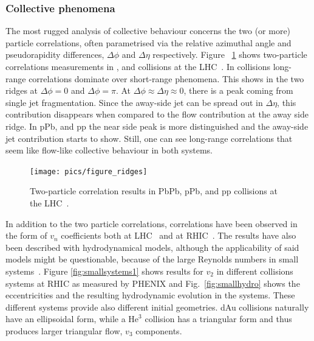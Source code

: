 \subsubsection{Collective phenomena}
The most rugged analysis of collective behaviour concerns the two (or more) particle correlations, often parametrised via the relative azimuthal angle and pseudorapidity differences, $\Delta \phi$ and $\Delta \eta$ respectively. Figure ~\ref{fig:smallsystems2} shows two-particle correlations measurements in \PbPb, \pPb and \pp collisions at the LHC~\cite{Aad:2015gqa}. In \PbPb collisions long-range correlations dominate over short-range phenomena. This shows in the two ridges at $\Delta \phi = 0 $ and $\Delta \phi = \pi$. At $\Delta\phi\approx\Delta\eta\approx0$, there is a peak coming from single jet fragmentation. Since the away-side jet can be spread out in $\Delta\eta$, this contribution disappears when compared to the flow contribution at the away side ridge. In pPb, and pp the near side peak is more distinguished and the away-side jet contribution starts to show. Still, one can see long-range correlations that seem like flow-like collective behaviour in both systems. 
\begin{figure}[b!]
\centering
            	\texttt{[image: pics/figure\_ridges]}
                \caption{Two-particle correlation results in PbPb, pPb, and pp collisions at the LHC~\cite{Aad:2015gqa}. }
	\label{fig:smallsystems2}
\end{figure}

In addition to the two particle correlations, correlations have been observed in the form of $v_n$ coefficients both at LHC~\cite{Acharya:2017ino} and at RHIC~\cite{Aidala:2016vgl}. The results have also been described  with hydrodynamical models, although the applicability of said models might be questionable, because of the large Reynolds numbers in small systems~\cite{Shen:2016zpp,Niemi:2014wta}. Figure \ref{fig:smallsystems1} shows results for $v_2$ in different collisions systems at RHIC as measured by PHENIX and Fig.~\ref{fig:smallhydro} shows the eccentricities and the resulting hydrodynamic evolution in the systems. These different systems provide also different initial geometries. dAu collisions naturally have an ellipsoidal form, while a $\mathrm{He}^3$ collision has a triangular form and thus produces larger triangular flow, $v_3$ components. 

